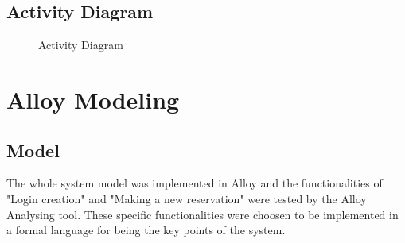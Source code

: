\documentclass[a4paper]{article}
\begin{document}
\subsection{Activity Diagram}
\begin{figure}[h]
\centering
\vspace*{\fill}
\noindent{}
\caption {Activity Diagram}
\vspace*{0.1cm}
\end{figure}
\newpage

\section{Alloy Modeling}
\subsection{Model}
The whole system model was implemented in Alloy and the functionalities of  "Login creation" and "Making a new reservation" were tested by the Alloy Analysing tool. These specific functionalities were choosen to be implemented in a formal language for being the key points of the system. 
\end{document}
